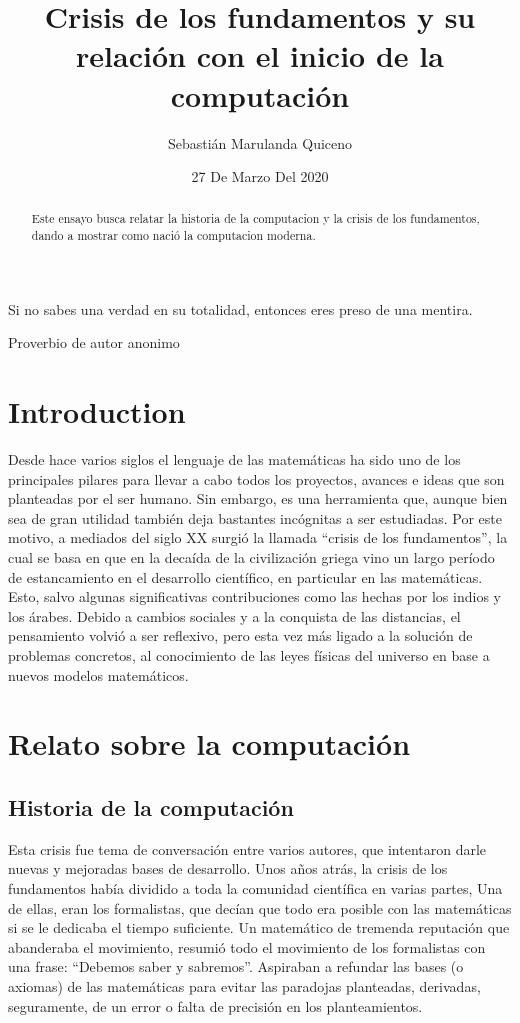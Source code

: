 \documentclass[a4paper]{article}
\title{Crisis de los fundamentos y su relación con el inicio de la computación}
\author{Sebastián Marulanda Quiceno}
\date{27 De Marzo Del 2020}
\begin{document}
\maketitle

\begin{abstract}
Este ensayo busca relatar la historia de la computacion y la crisis de los fundamentos, dando a mostrar como nació la computacion moderna.

\end{abstract}

\epigraph{Si no sabes una verdad en su totalidad, entonces eres preso de una mentira.}{Proverbio de autor anonimo}


\section{Introduction}

Desde hace varios siglos el lenguaje de las matemáticas ha sido uno de los principales pilares para llevar a cabo todos los proyectos, avances e ideas que son planteadas por el ser humano. Sin embargo, es una herramienta que, aunque bien sea de gran utilidad también deja bastantes incógnitas a ser estudiadas. Por este motivo, a mediados del siglo XX surgió la llamada “crisis de los fundamentos”, la cual se basa en que en la decaída de la civilización griega vino un largo período de estancamiento en el desarrollo científico, en particular en las matemáticas. Esto, salvo algunas significativas contribuciones como las hechas por los indios y los árabes. Debido a cambios sociales y a la conquista de las distancias, el pensamiento volvió a ser reflexivo, pero esta vez más ligado a la solución de problemas concretos, al conocimiento de las leyes físicas del universo en base a nuevos modelos matemáticos.


\section{Relato sobre la computación}
\label{sec:examples}

\subsection{Historia de la computación}

Esta crisis fue tema de conversación entre varios autores, que intentaron darle nuevas y mejoradas bases de desarrollo. Unos años atrás, la crisis de los fundamentos había dividido a toda la comunidad científica en varias partes, Una de ellas, eran los formalistas, que decían que todo era posible con las matemáticas si se le dedicaba el tiempo suficiente. Un matemático de tremenda reputación que abanderaba el movimiento, resumió todo el movimiento de los formalistas con una frase: “Debemos saber y sabremos”. Aspiraban a refundar las bases (o axiomas) de las matemáticas para evitar las paradojas planteadas, derivadas, seguramente, de un error o falta de precisión en los planteamientos.
\end{document}
